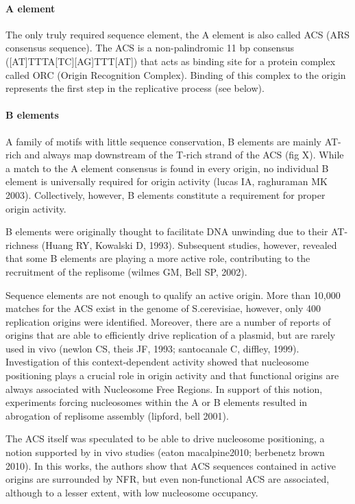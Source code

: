 \paragraph{A element}
The only truly required sequence element, the A element is also called ACS (ARS consensus sequence). The ACS is a non-palindromic 11 bp consensus ([AT]TTTA[TC][AG]TTT[AT]) that acts as binding site for a protein complex called ORC (Origin Recognition Complex). Binding of this complex to the origin represents the first step in the replicative process (see below).

\paragraph{B elements}
A family of motifs with little sequence conservation, B elements are mainly AT-rich and always map downstream of the T-rich strand of the ACS (fig X). While a match to the A element consensus is found in every origin, no individual B element is universally required for origin activity (lucas IA, raghuraman MK  2003). Collectively, however, B elements constitute a requirement for proper origin activity.

B elements were originally thought to facilitate DNA unwinding due to their AT-richness (Huang RY, Kowalski D, 1993). Subsequent studies, however, revealed that some B elements are playing a more active role, contributing to the recruitment of the replisome (wilmes GM, Bell SP, 2002).

\vspace{5mm}

Sequence elements are not enough to qualify an active origin. More than 10,000 matches for the ACS exist in the genome of S.cerevisiae, however, only 400 replication origins were identified. Moreover, there are a number of reports of origins that are able to efficiently drive replication of a plasmid, but are rarely used in vivo (newlon CS, theis JF, 1993; santocanale C, diffley, 1999). Investigation of this context-dependent activity showed that nucleosome positioning plays a crucial role in origin activity and that functional origins are always associated with Nucleosome Free Regions. In support of this notion, experiments forcing nucleosomes within the A or B elements resulted in abrogation of replisome assembly (lipford, bell 2001). 

The ACS itself was speculated to be able to drive nucleosome positioning, a notion supported by in vivo studies (eaton macalpine2010; berbenetz brown 2010). In this works, the authors show that ACS sequences contained in active origins are surrounded by NFR, but even non-functional ACS are associated, although to a lesser extent, with low nucleosome occupancy.

